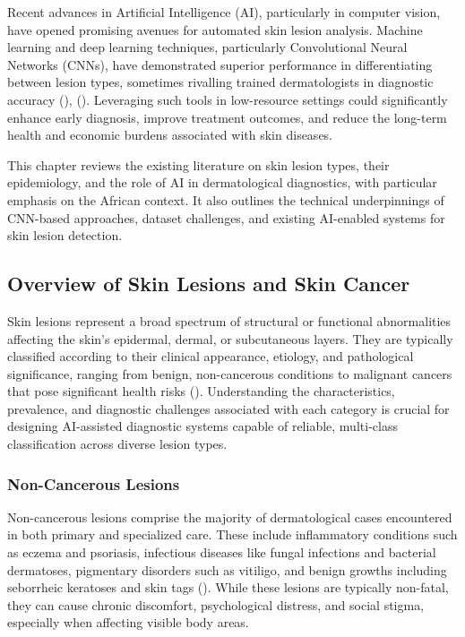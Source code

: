 \documentclass[
  12pt,
  oneside]{article}
\begin{document}
Recent advances in Artificial Intelligence (AI), particularly in
computer vision, have opened promising avenues for automated skin lesion
analysis. Machine learning and deep learning techniques, particularly
Convolutional Neural Networks (CNNs), have demonstrated superior
performance in differentiating between lesion types, sometimes rivalling
trained dermatologists in diagnostic accuracy
(),
(). Leveraging such
tools in low-resource settings could significantly enhance early
diagnosis, improve treatment outcomes, and reduce the long-term health
and economic burdens associated with skin diseases.

This chapter reviews the existing literature on skin lesion types, their
epidemiology, and the role of AI in dermatological diagnostics, with
particular emphasis on the African context. It also outlines the
technical underpinnings of CNN-based approaches, dataset challenges, and
existing AI-enabled systems for skin lesion detection.

\subsection{Overview of Skin Lesions and Skin
Cancer}\label{overview-of-skin-lesions-and-skin-cancer}

Skin lesions represent a broad spectrum of structural or functional
abnormalities affecting the skin's epidermal, dermal, or subcutaneous
layers. They are typically classified according to their clinical
appearance, etiology, and pathological significance, ranging from
benign, non-cancerous conditions to malignant cancers that pose
significant health risks (). Understanding the characteristics, prevalence, and diagnostic
challenges associated with each category is crucial for designing
AI-assisted diagnostic systems capable of reliable, multi-class
classification across diverse lesion types.

\subsubsection{Non-Cancerous Lesions}\label{non-cancerous-lesions}

Non-cancerous lesions comprise the majority of dermatological cases
encountered in both primary and specialized care. These include
inflammatory conditions such as eczema and psoriasis, infectious
diseases like fungal infections and bacterial dermatoses, pigmentary
disorders such as vitiligo, and benign growths including seborrheic
keratoses and skin tags ().
While these lesions are typically non-fatal, they can cause chronic
discomfort, psychological distress, and social stigma, especially when
affecting visible body areas.
\end{document}
